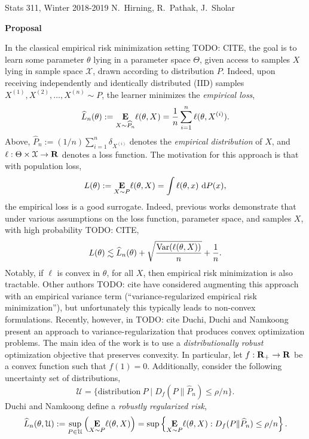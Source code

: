 \documentclass[11pt, reqno, oneside, letterpaper]{article}
\newcommand{\todo}[1]{{\color{red} TODO: {#1}}}
\renewcommand*\d{\mathop{}\!\mathrm{d}}
\let\hat\widehat
\begin{document}
{\parindent 0pt
Stats 311, Winter 2018-2019 \hfill
N.\ Hirning, R.\ Pathak, J.\ Sholar \vskip 0.2in}

\begin{center}
\large{\bf Proposal}
\end{center}

In the classical empirical risk minimization setting \todo{CITE}, the goal is 
to learn some parameter $\theta$ lying in a parameter space $\Theta$, given access to 
samples $X$ lying in sample space $\mathcal{X}$, drawn according to distribution $P$. Indeed, upon receiving independently and identically distributed 
(IID) samples $X^{(1)}, X^{(2)}, \dots, X^{(n)} \sim P$, the learner minimizes the \emph{empirical loss}, 
\[
\widehat L_n(\theta) := \underset{{X \sim \hat P_n}}{\E} \ell(\theta, X) = \frac{1}{n}\sum_{i=1}^n 
\ell(\theta, X^{(i)}). 
\]
Above, $\widehat P_n := (1/n)\sum_{i=1}^n \delta_{X^{(i)}}$ denotes the \emph{empirical
distribution} of $X$, and $\ell: \Theta \times \mathcal{X} \to \mathbf{R}$ denotes a loss 
function. The motivation for this approach is that with population loss,
\[
L(\theta) := \underset{X \sim P}{\E} \ell(\theta, X) = \int \ell(\theta, x) \, \d P(x),
\]
the empirical loss is a good surrogate. Indeed, previous works demonstrate that under various assumptions on the 
loss function, parameter space, and samples $X$, with high probability \todo{CITE}, 
\[
L(\theta) \lesssim \hat L_n(\theta) + \sqrt{\frac{\Var(\ell(\theta, X))}{n}} + \frac{1}{n}.
\]
Notably, if $\ell$ is convex in $\theta$, for all $X$, then empirical risk minimization is also tractable.
Other authors \todo{cite} have considered augmenting this approach with an empirical variance term
(``variance-regularized empirical risk minimization''), but unfortunately this typically leads to
non-convex formulations. Recently, however, in \todo{cite Duchi}, Duchi and Namkoong present an approach
to variance-regularization that produces convex optimization problems. The main idea of the work is to use
a \emph{distributionally robust} optimization objective that preserves convexity. In particular, let $f: \mathbf{R}_+ \to \mathbf{R}$ be a convex function such that $f(1) = 0$. Additionally, consider the following uncertainty set
of distributions,
\[
\mathcal{U} = \{\text{distribution}~P \mid D_f(P \| \hat P_n) \leq \rho/n\}.  
\]
Duchi and Namkoong define a \emph{robustly regularized risk},
\[
\hat L_n(\theta, \mathcal{U}) := \sup_{P \in \mathcal{U}} \left(\underset{X \sim P}{\E} \ell(\theta, X) \right)=
\sup\left\{ \underset{X \sim P}{\E} \ell(\theta, X) : D_f(P \| \hat P_n) \leq \rho/n \right\}. 
\]
\end{document}
